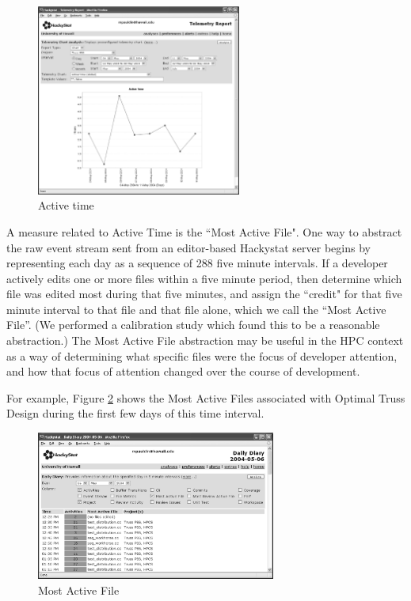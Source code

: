 \documentclass[times,10pt,twocolumn]{article}
\begin{document}
\begin{figure}[htpb]
  \centering
  \includegraphics[width=0.60\textwidth]{truss.activetime2.eps}
  \caption{Active time}
  \label{fig:activetime}
\end{figure}

\label{sec:mostactivefile}

A measure related to Active Time is the ``Most Active File".  One way to
abstract the raw event stream sent from an editor-based Hackystat server
begins by representing each day as a sequence of 288 five minute intervals.
If a developer actively edits one or more files within a five minute
period, then determine which file was edited most during that five minutes,
and assign the ``credit" for that five minute interval to that file and that
file alone, which we call the ``Most Active File''.  (We performed a
calibration study which found this to be a reasonable abstraction.)  The
Most Active File abstraction may be useful in the HPC context as a way of
determining what specific files were the focus of developer attention, and
how that focus of attention changed over the course of development.

For example, Figure \ref{fig:mostactivefile} shows the Most Active
Files associated with Optimal Truss Design during the first few days
of this time interval.  

\begin{figure}[htpb]
  \centering
  \includegraphics[width=0.70\textwidth]{truss.mostactivefile.eps}
  \caption{Most Active File}
  \label{fig:mostactivefile}
\end{figure}
\end{document}
